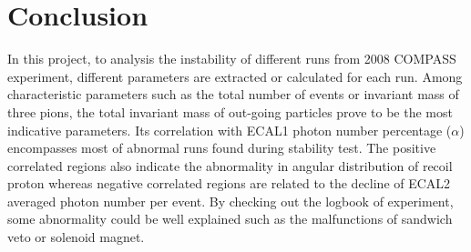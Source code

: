 \section{Conclusion}
In this project, to analysis the instability of different runs from 2008 COMPASS experiment, different parameters are extracted or calculated for each run. Among characteristic parameters such as the total number of events or invariant mass of three pions, the total invariant mass of out-going particles prove to be the most indicative parameters. Its correlation with ECAL1 photon number percentage ($\alpha$) encompasses most of abnormal runs found during stability test. The positive correlated regions also indicate the abnormality in angular distribution of recoil proton whereas negative correlated regions are related to the decline of ECAL2 averaged photon number per event. By checking out the logbook of experiment, some abnormality could be well explained such as the malfunctions of sandwich veto or solenoid magnet.